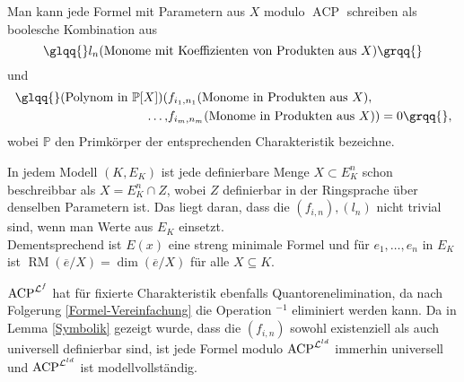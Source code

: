     \begin{corollary}\label{Formel-Vereinfachung}
    	Man kann jede Formel mit Parametern aus $X$ modulo $\operatorname{ACP}$ schreiben als boolesche Kombination aus $$\glqq{}l_n(\text{Monome mit Koeffizienten von Produkten aus }X)\grqq{}$$ und
    	\begin{align*}
    	\text{\glqq{}}(\text{Polynom in }\mathbb{P}[X])(&f_{i_1,n_1}(\text{Monome in Produkten aus }X),\\\dots,&f_{i_m,n_m}(\text{Monome in Produkten aus }X))=0\grqq{},
    	\end{align*}
        wobei $\mathbb{P}$ den Primkörper der entsprechenden Charakteristik bezeichne.
    \end{corollary}
    \begin{corollary}
    	In jedem Modell $(K,E_K)$ ist jede definierbare Menge $X\subset E_K^n$ schon beschreibbar als $X=E_K^n\cap Z$, wobei $Z$ definierbar in der Ringsprache über denselben Parametern ist. Das liegt daran, dass die $(f_{i,n}),(l_n)$ nicht trivial sind, wenn man Werte aus $E_K$ einsetzt.\\ Dementsprechend ist $E(x)$ eine streng minimale Formel und für $e_1,\dots,e_n$ in $E_K$ ist $\operatorname{RM}(\overline{e}/X)=\dim(\overline{e}/X)$ für alle $X\subseteq K$.
    \end{corollary}
    \begin{corollary}
    	$\operatorname{ACP}^{\mathcal{L}^f}$ hat für fixierte Charakteristik ebenfalls Quantorenelimination, da nach Folgerung \ref{Formel-Vereinfachung} die Operation \glqq{}$^{-1}$\grqq{} eliminiert werden kann. Da in Lemma \ref{Symbolik} gezeigt wurde, dass die $(f_{i,n})$ sowohl existenziell als auch universell definierbar sind, ist jede Formel modulo $\operatorname{ACP}^{\mathcal{L}^{ld}}$ immerhin universell und $\operatorname{ACP}^{\mathcal{L}^{ld}}$ ist modellvollständig.
    \end{corollary}
    
